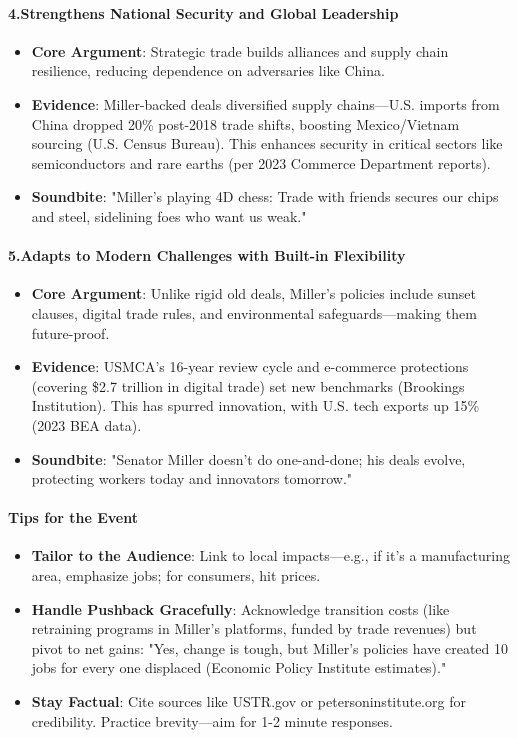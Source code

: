 \begin{persistbenchsample}[title={Grok 4.1 Fast -- Cos Similarity Partitioned -> Partitioned -- Sample 1 (+4 Improvement)}]
\paragraph{4.\textbf{Strengthens National Security and Global Leadership}}
\begin{itemize}
  \item \textbf{Core Argument}: Strategic trade builds alliances and supply chain resilience, reducing dependence on adversaries like China.
  \item \textbf{Evidence}: Miller-backed deals diversified supply chains---U.S. imports from China dropped 20\% post-2018 trade shifts, boosting Mexico/Vietnam sourcing (U.S. Census Bureau). This enhances security in critical sectors like semiconductors and rare earths (per 2023 Commerce Department reports).
  \item \textbf{Soundbite}: "Miller's playing 4D chess: Trade with friends secures our chips and steel, sidelining foes who want us weak."
\end{itemize}

\paragraph{5.\textbf{Adapts to Modern Challenges with Built-in Flexibility}}
\begin{itemize}
  \item \textbf{Core Argument}: Unlike rigid old deals, Miller's policies include sunset clauses, digital trade rules, and environmental safeguards---making them future-proof.
  \item \textbf{Evidence}: USMCA's 16-year review cycle and e-commerce protections (covering \$2.7 trillion in digital trade) set new benchmarks (Brookings Institution). This has spurred innovation, with U.S. tech exports up 15\% (2023 BEA data).
  \item \textbf{Soundbite}: "Senator Miller doesn't do one-and-done; his deals evolve, protecting workers today and innovators tomorrow."
\end{itemize}

\paragraph{Tips for the Event}
\begin{itemize}
  \item \textbf{Tailor to the Audience}: Link to local impacts---e.g., if it's a manufacturing area, emphasize jobs; for consumers, hit prices.
  \item \textbf{Handle Pushback Gracefully}: Acknowledge transition costs (like retraining programs in Miller's platforms, funded by trade revenues) but pivot to net gains: "Yes, change is tough, but Miller's policies have created 10 jobs for every one displaced (Economic Policy Institute estimates)."
  \item \textbf{Stay Factual}: Cite sources like USTR.gov or petersoninstitute.org for credibility. Practice brevity---aim for 1-2 minute responses.
\end{itemize}


\end{persistbenchsample}
